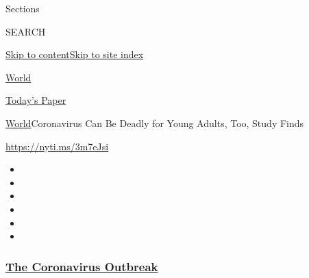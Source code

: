 Sections

SEARCH

\protect\hyperlink{site-content}{Skip to
content}\protect\hyperlink{site-index}{Skip to site index}

\href{https://www.nytimes3xbfgragh.onion/section/world}{World}

\href{https://myaccount.nytimes3xbfgragh.onion/auth/login?response_type=cookie\&client_id=vi}{}

\href{https://www.nytimes3xbfgragh.onion/section/todayspaper}{Today's
Paper}

\href{/section/world}{World}\textbar{}Coronavirus Can Be Deadly for
Young Adults, Too, Study Finds

\url{https://nyti.ms/3m7eJsi}

\begin{itemize}
\item
\item
\item
\item
\item
\item
\end{itemize}

\hypertarget{the-coronavirus-outbreak}{%
\subsubsection{\texorpdfstring{\href{https://www.nytimes3xbfgragh.onion/news-event/coronavirus?name=styln-coronavirus-national\&region=TOP_BANNER\&block=storyline_menu_recirc\&action=click\&pgtype=Article\&impression_id=751352c0-f4b5-11ea-b564-bd1dfc5ec362\&variant=undefined}{The
Coronavirus
Outbreak}}{The Coronavirus Outbreak}}\label{the-coronavirus-outbreak}}

